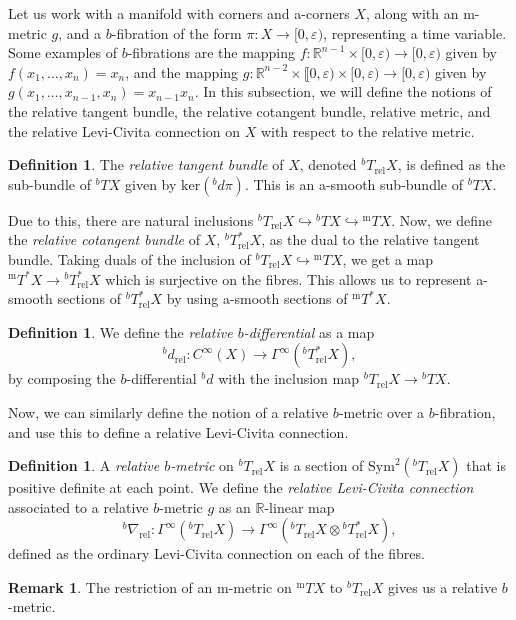 \documentclass[10pt, a4paper]{article}
\theoremstyle{plain}%
\theoremstyle{definition}
\newtheorem{defn}[theorem]{Definition}
\newtheorem{rem}[theorem]{Remark}
\numberwithin{figure}{section}
\numberwithin{equation}{section}
\newcommand{\bR}{\mathbb{R}}
\newcommand{\rt}{\rightarrow}
\newcommand{\ep}{\varepsilon}
\newcommand{\rel}{\mathrm{rel}}
\newcommand{\m}{\mathrm{m}}
\begin{document}
Let us work with a manifold with corners and a-corners $X$, along with an m-metric $g$, and a $b$-fibration of the form $\pi: X\rt [ 0,\varepsilon)$, representing a time variable. Some examples of $b$-fibrations are the mapping $f:\bR^{n-1}\times[0,\ep)\rt [ 0,\ep)$ given by $f(x_1,\dots,x_n)=x_n$, and the mapping $g: \bR^{n-2}\times\llbracket0,\ep)\times [ 0,\ep)\rt [0,\ep)$ given by $g(x_1,\dots,x_{n-1},x_n)=x_{n-1}x_n$. In this subsection, we will define the notions of the relative tangent bundle, the relative cotangent bundle, relative metric, and the relative Levi-Civita connection on $X$ with respect to the relative metric.
\begin{defn}
	The \textit{relative tangent bundle} of $X$, denoted $^bT_\mathrm{rel}X$, is defined as the sub-bundle of $^bTX$ given by $\mathrm{ker}(^bd\pi)$. This is an a-smooth sub-bundle of $^bTX$.
\end{defn}
Due to this, there are natural inclusions $^bT_\mathrm{rel}X\hookrightarrow {^bTX} \hookrightarrow {^{\m}TX}$. Now, we define the \textit{relative cotangent bundle} of $X$, $^bT^*_\mathrm{rel}X$, as the dual to the relative tangent bundle. Taking duals of the inclusion of $^bT_\mathrm{rel}X \hookrightarrow {^{\m}TX}$, we get a map $^{\m}T^*X \rt {^bT^*_\mathrm{rel}}X$ which is surjective on the fibres. This allows us to represent a-smooth sections of $ {^bT^*_\mathrm{rel}}X$ by using a-smooth sections of $^{\m}T^*X$.

\begin{defn}
	We define the \textit{relative $b$-differential} as a map \[
	^bd_\mathrm{rel} : C^\infty(X) \rt \Gamma^{\infty}(^bT^*_\mathrm{rel}X),
	\]
	by composing the $b$-differential $^bd$ with the inclusion map $^bT_\rel X\rt {^bT}X$.
\end{defn}
Now, we can similarly define the notion of a relative $b$-metric over a $b$-fibration, and use this to define a relative Levi-Civita connection.
\begin{defn}
	A \textit{relative $b$-metric} on $^bT_\rel X$ is a section of $\textrm{Sym}^2(^bT_\rel X)$ that is positive definite at each point. We define the \textit{relative Levi-Civita connection} associated to a relative $b$-metric $g$ as an $\bR$-linear map \[
	^b\nabla_\mathrm{rel}: \Gamma^\infty(^bT_\mathrm{rel}X) \rt  \Gamma^\infty(^bT_{\mathrm{rel}}X \otimes {^b}T^*_{\mathrm{rel}}X),
	\]
	defined as the ordinary Levi-Civita connection on each of the fibres.
\end{defn}
\begin{rem}
The restriction of an m-metric on $^{\m}TX$ to $^bT_\rel X$ gives us a relative $b$-metric. 	
\end{rem}
\end{document}
